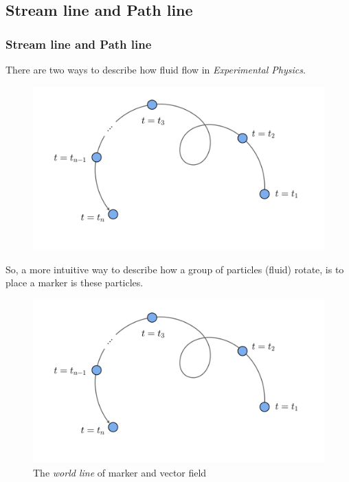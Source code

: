 \documentclass[11pt,]{beamer}
\begin{document}
\subsection{Stream line and Path line}
\begin{frame}
\frametitle{Stream line and Path line}
	There are two ways to describe how fluid flow in \textit{Experimental Physics}.
	\begin{figure}
    \includegraphics[page=5, width=0.9\linewidth]{imgs.pdf}
	\end{figure}
\end{frame}
\begin{frame}
	So, a more intuitive way to describe how a group of particles (fluid) rotate,
	is to place a marker is these particles. 
	\begin{figure}
    \includegraphics[page=6, width=0.9\linewidth]{imgs.pdf}
    \caption{The \textit{world line} of marker and vector field}
	\end{figure}
\end{frame}
\end{document}
